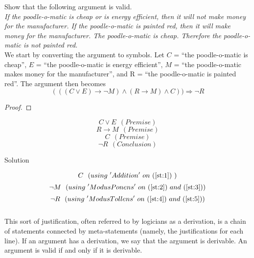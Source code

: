\documentclass[]{article}
\begin{document}
\begin{exmp} Show that the following argument is valid.\\
\emph{If the poodle-o-matic is cheap or is energy efficient, then it will not make money for the manufacturer. If the poodle-o-matic is painted red, then it will make money for the manufacturer. The poodle-o-matic is cheap. Therefore the poodle-o-matic is not painted red.}\\
We start by converting the argument to symbols. Let $C$ = ``the poodle-o-matic is cheap'', $E$ = ``the poodle-o-matic is energy efficient'', $M$ = ``the poodle-o-matic makes money for the manufacturer'', and R = ``the poodle-o-matic is painted red''. The argument then becomes
\begin{equation}
		 (((C \vee E) \rightarrow \neg M) \wedge (R \rightarrow M) \wedge C)) \Rightarrow \neg R
\end{equation}
\begin{proof}

\end{proof}
	\begin{equation} \label{st:2} 
		C \vee E ~~(Premise)
		\end{equation}
		\begin{equation} \label{st:4}   
		R \rightarrow M ~~(Premise)
		\end{equation}
		\begin{equation} \label{st:1}
		C ~~(Premise)
		\end{equation}
		\begin{equation}
		\neg R ~~(Conclusion)
		\end{equation}
	
		\item Solution
		
		
		\begin{equation} \label{st:3}
		C  ~~ (using~ 'Addition'~ on ~ (\ref{st:1})~)
		\end{equation} 
		\begin{equation} \label{st:5}
		\neg M ~~ (using~ 'Modus Ponens'~ on ~ (\ref{st:2}) ~ and ~ (\ref{st:3}))
		\end{equation}
		\begin{equation}
		\neg R ~~ (using~ 'Modus Tollens'~ on ~ (\ref{st:4}) ~ and ~ (\ref{st:5}))
		\end{equation}
		\\This sort of justification, often referred to by logicians as a derivation, is a chain of statements connected by meta-statements (namely, the justifications for each line). If an argument has a derivation, we say that the argument is derivable. An argument is valid if and only if it is derivable.
		
	\end{exmp}
\end{document}
